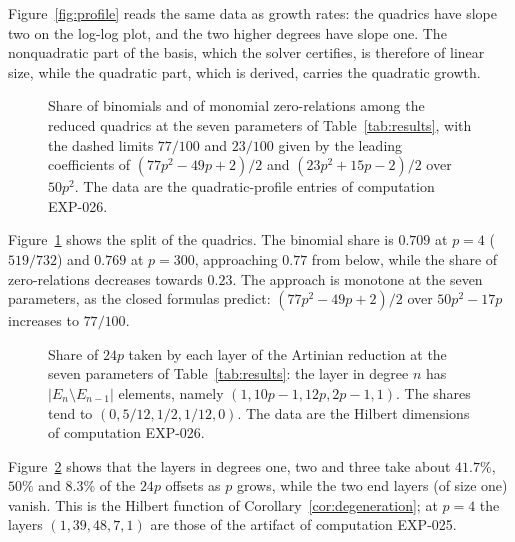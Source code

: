 \documentclass[11pt]{article}
\theoremstyle{definition}
\theoremstyle{remark}
\begin{document}
Figure~\ref{fig:profile} reads the same data as growth rates: the quadrics have slope two on the
log-log plot, and the two higher degrees have slope one. The nonquadratic part of the basis,
which the solver certifies, is therefore of linear size, while the quadratic part, which is
derived, carries the quadratic growth.

\begin{figure}[ht]
\centering

\caption{Share of binomials and of monomial zero-relations among the reduced quadrics at the
seven parameters of Table~\ref{tab:results}, with the dashed limits $77/100$ and $23/100$ given by the
leading coefficients of $(77p^2-49p+2)/2$ and $(23p^2+15p-2)/2$ over $50p^2$. The data are the
quadratic-profile entries of computation EXP-026.}
\label{fig:split}
\end{figure}

Figure~\ref{fig:split} shows the split of the quadrics. The binomial share is $0.709$ at $p=4$
($519/732$) and $0.769$ at $p=300$, approaching $0.77$ from below, while the share of zero-relations
decreases towards $0.23$. The approach is monotone at the seven parameters, as the closed
formulas predict: $(77p^2-49p+2)/2$ over $50p^2-17p$ increases to $77/100$.

\begin{figure}[ht]
\centering

\caption{Share of $24p$ taken by each layer of the Artinian reduction at the seven parameters of
Table~\ref{tab:results}: the layer in degree $n$ has $\lvert E_n\setminus E_{n-1}\rvert$ elements, namely
$(1,10p-1,12p,2p-1,1)$. The shares tend to $(0,5/12,1/2,1/12,0)$. The data are the Hilbert
dimensions of computation EXP-026.}
\label{fig:layers}
\end{figure}

Figure~\ref{fig:layers} shows that the layers in degrees one, two and three take about
$41.7\%$, $50\%$ and $8.3\%$ of the $24p$ offsets as $p$ grows, while the two end layers
(of size one) vanish. This is the Hilbert function of Corollary~\ref{cor:degeneration}; at
$p=4$ the layers $(1,39,48,7,1)$ are those of the artifact of computation EXP-025.

\begin{table}[ht]
\centering
\small
\resizebox{\textwidth}{!}{}
\caption{Aggregate SHA-256 digests of the five exact computations, in full: the digest of a
computation is the SHA-256 of the list of its row hashes (or, for the Presburger obligations, of the
list of the query digests). Two computations of the same quantity were encoded independently in
each pair of rows (primary and recomputation).}
\label{tab:aggregates}
\end{table}
\end{document}
